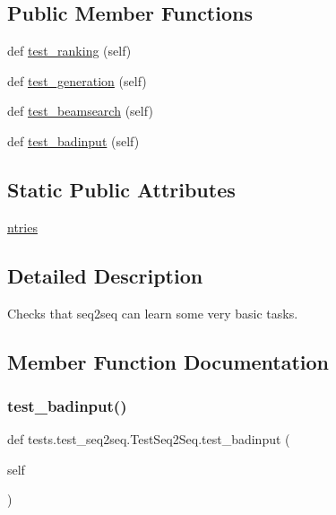 \subsection*{Public Member Functions}
\begin{DoxyCompactItemize}
\item 
def \hyperlink{classtests_1_1test__seq2seq_1_1TestSeq2Seq_a967d49fc0e124148c7ac4488dd788bc7}{test\+\_\+ranking} (self)
\item 
def \hyperlink{classtests_1_1test__seq2seq_1_1TestSeq2Seq_a203ba54e9671ce31936a202a4e2e6686}{test\+\_\+generation} (self)
\item 
def \hyperlink{classtests_1_1test__seq2seq_1_1TestSeq2Seq_a78cb1bf4c31e8cd73d53e48797b9d7d9}{test\+\_\+beamsearch} (self)
\item 
def \hyperlink{classtests_1_1test__seq2seq_1_1TestSeq2Seq_ab550295b1910a3576b5b0ed9d426f831}{test\+\_\+badinput} (self)
\end{DoxyCompactItemize}
\subsection*{Static Public Attributes}
\begin{DoxyCompactItemize}
\item 
\hyperlink{classtests_1_1test__seq2seq_1_1TestSeq2Seq_a5681e61335c043954e727fa9eb4b1eb3}{ntries}
\end{DoxyCompactItemize}


\subsection{Detailed Description}
\begin{DoxyVerb}Checks that seq2seq can learn some very basic tasks.
\end{DoxyVerb}
 

\subsection{Member Function Documentation}
\mbox{\label{classtests_1_1test__seq2seq_1_1TestSeq2Seq_ab550295b1910a3576b5b0ed9d426f831}} 
\subsubsection{\texorpdfstring{test\+\_\+badinput()}{test\_badinput()}}
{\footnotesize\ttfamily def tests.\+test\+\_\+seq2seq.\+Test\+Seq2\+Seq.\+test\+\_\+badinput (\begin{DoxyParamCaption}\item[{}]{self }\end{DoxyParamCaption})}

